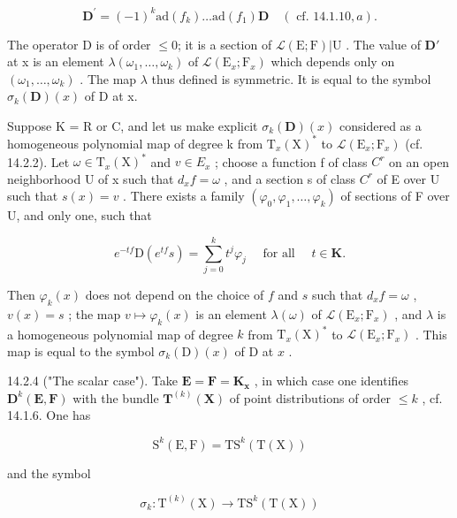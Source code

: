 \[
\mathbf {D} ^ {\prime} = (- 1) ^ {k} \mathrm{ad} (f _ {k}) \dots \mathrm{ad} (f _ {1}) \mathbf {D} \quad (\text { cf. } 14.1.10, a).
\]

The operator D is of order \(\leqslant0\); it is a section of \(\mathcal{L}(\mathrm{E};\mathrm{F})|\mathrm{U}\) . The value of \(\mathbf{D}'\) at x is an element \(\lambda(\omega_{1},\ldots,\omega_{k})\) of \(\mathcal{L}(\mathrm{E}_{x};\mathrm{F}_{x})\) which depends only on \((\omega_{1},\ldots,\omega_{k})\) . The map \(\lambda\) thus defined is symmetric. It is equal to the symbol \(\sigma_{k}(\mathbf{D})(x)\) of D at x.

Suppose K = R or C, and let us make explicit \(\sigma_{k}(\mathbf{D})(x)\) considered as a homogeneous polynomial map of degree k from \(\mathrm{T}_{x}(\mathrm{X})^{*}\) to \(\mathcal{L}(\mathrm{E}_{x};\mathrm{F}_{x})\) (cf. 14.2.2). Let \(\omega \in \mathrm{T}_{x}(\mathrm{X})^{*}\) and \(v \in E_{x}\) ; choose a function f of class \(C^{r}\) on an open neighborhood U of x such that \(d_{x}f = \omega\) , and a section s of class \(C^{r}\) of E over U such that \(s(x) = v\) . There exists a family \((\varphi_{0}, \varphi_{1}, \ldots, \varphi_{k})\) of sections of F over U, and only one, such that

\[
e ^ {- t f} \mathrm{D} (e ^ {t f} s) = \sum_ {j = 0} ^ {k} t ^ {j} \varphi_ {j} \quad \text { for all } \quad t \in \mathbf {K}.
\]

Then \(\varphi_{k}(x)\) does not depend on the choice of \(f\) and \(s\) such that \(d_{x}f = \omega\) , \(v(x) = s\) ; the map \(v \mapsto \varphi_{k}(x)\) is an element \(\lambda(\omega)\) of \(\mathcal{L}(\mathrm{E}_{x}; \mathrm{F}_{x})\) , and \(\lambda\) is a homogeneous polynomial map of degree \(k\) from \(\mathrm{T}_{x}(\mathrm{X})^{*}\) to \(\mathcal{L}(\mathrm{E}_{x}; \mathrm{F}_{x})\) . This map is equal to the symbol \(\sigma_{k}(\mathrm{D})(x)\) of D at \(x\) .

14.2.4 ("The scalar case"). Take \(\mathbf{E} = \mathbf{F} = \mathbf{K}_{\mathbf{x}}\) , in which case one identifies \(\mathbf{D}^k(\mathbf{E}, \mathbf{F})\) with the bundle \(\mathbf{T}^{(k)}(\mathbf{X})\) of point distributions of order \(\leqslant k\) , cf. 14.1.6. One has

\[
\mathrm{S} ^ {k} (\mathrm{E}, \mathrm{F}) = \mathrm{TS} ^ {k} (\mathrm{T} (\mathrm{X}))
\]

and the symbol

\[
\sigma_ {k} \colon \mathrm{T} ^ {(k)} (\mathrm{X}) \rightarrow \mathrm{TS} ^ {k} (\mathrm{T} (\mathrm{X}))
\]

